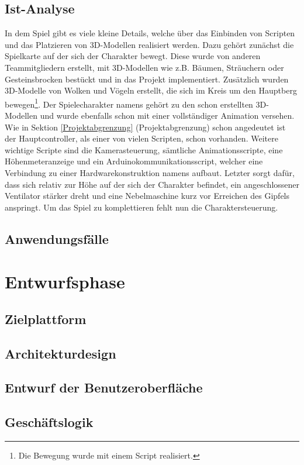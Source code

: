 \section{Ist-Analyse}
In dem Spiel gibt es viele kleine Details, welche über das Einbinden von Scripten und das Platzieren von 3D-Modellen realisiert werden. Dazu gehört zunächst die Spielkarte auf der sich der Charakter bewegt. Diese wurde von anderen Teammitgliedern erstellt, mit 3D-Modellen wie z.B. Bäumen, Sträuchern oder Gesteinsbrocken bestückt und in das Projekt implementiert. Zusätzlich wurden 3D-Modelle von Wolken und Vögeln erstellt, die sich im Kreis um den Hauptberg bewegen\footnote{Die Bewegung wurde mit einem Script realisiert.}.
Der Spielecharakter namens  gehört zu den schon erstellten 3D-Modellen und wurde ebenfalls schon mit einer vollständiger Animation versehen.
Wie in Sektion \ref{Projektabgrenzung} (Projektabgrenzung) schon angedeutet ist der Hauptcontroller, als einer von vielen Scripten, schon vorhanden. Weitere wichtige Scripte sind die Kamerasteuerung, sämtliche Animationsscripte, eine Höhenmeteranzeige und ein Arduinokommunikationsscript, welcher eine Verbindung zu einer Hardwarekonstruktion namens  aufbaut. Letzter sorgt dafür, dass sich relativ zur Höhe auf der sich der Charakter befindet, ein angeschlossener Ventilator stärker dreht und eine Nebelmaschine kurz vor Erreichen des Gipfels anspringt.
Um das Spiel zu komplettieren fehlt nun die Charaktersteuerung. 

\section{Anwendungsfälle}

\chapter{Entwurfsphase}
\section{Zielplattform}
\section{Architekturdesign}
\section{Entwurf der Benutzeroberfläche}
\section{Geschäftslogik}
